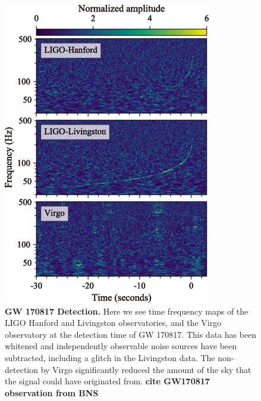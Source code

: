 \documentclass[11pt]{cuthesis}
\begin{document}
\begin{figure} %
\begin{center}
\includegraphics[width=0.8\linewidth]{gw170817_ifo_strain.png}
\end{center}
\caption{\textbf{GW 170817 Detection.} Here we see time frequency maps of the LIGO Hanford and Livingston observatories, and the Virgo observatory at the detection time of GW 170817. This data has been whitened and independently observable noise sources have been subtracted, including a glitch in the Livingston data. The non-detection by Virgo significantly reduced the amount of the sky that the signal could have originated from. \textbf{cite GW170817 observation from BNS} }
\label{fig:170817 ifo strain}
\end{figure}
\end{document}
